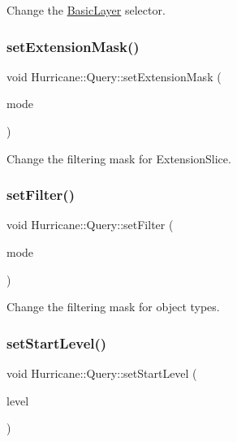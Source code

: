 Change the \mbox{\hyperlink{classHurricane_1_1BasicLayer}{Basic\+Layer}} selector. \mbox{\label{classHurricane_1_1Query_af7f83fd3aefe1b5654f9bdd3566fe0d4}} 
\subsubsection{\texorpdfstring{set\+Extension\+Mask()}{setExtensionMask()}}
{\footnotesize\ttfamily void Hurricane\+::\+Query\+::set\+Extension\+Mask (\begin{DoxyParamCaption}\item[{Extension\+Slice\+::\+Mask}]{mode }\end{DoxyParamCaption})\hspace{0.3cm}{\ttfamily [inline]}}

Change the filtering mask for Extension\+Slice. \mbox{\label{classHurricane_1_1Query_a457a0cda5ea5ad849a46aefce2514963}} 
\subsubsection{\texorpdfstring{set\+Filter()}{setFilter()}}
{\footnotesize\ttfamily void Hurricane\+::\+Query\+::set\+Filter (\begin{DoxyParamCaption}\item[{Mask}]{mode }\end{DoxyParamCaption})\hspace{0.3cm}{\ttfamily [inline]}}

Change the filtering mask for object types. \mbox{\label{classHurricane_1_1Query_a8c4bc1bcfae942042ccb90a46b6fb510}} 
\subsubsection{\texorpdfstring{set\+Start\+Level()}{setStartLevel()}}
{\footnotesize\ttfamily void Hurricane\+::\+Query\+::set\+Start\+Level (\begin{DoxyParamCaption}\item[{unsigned int}]{level }\end{DoxyParamCaption})\hspace{0.3cm}{\ttfamily [inline]}}

